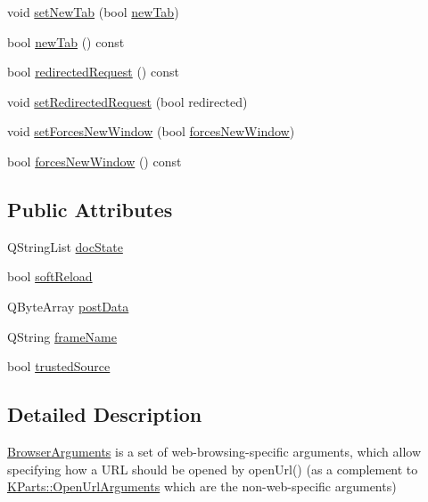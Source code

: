 \begin{DoxyCompactItemize}
\item 
void \hyperlink{structKParts_1_1BrowserArguments_a17bbf30d75c3e5c4d906b91b1c8eed3b}{set\-New\-Tab} (bool \hyperlink{structKParts_1_1BrowserArguments_acdc75a4b3726424aabb4958d58b6e586}{new\-Tab})
\item 
bool \hyperlink{structKParts_1_1BrowserArguments_acdc75a4b3726424aabb4958d58b6e586}{new\-Tab} () const 
\item 
bool \hyperlink{structKParts_1_1BrowserArguments_a3a3c15968b056a76248f483ea613740a}{redirected\-Request} () const 
\item 
void \hyperlink{structKParts_1_1BrowserArguments_a7169bd696dd783e0312f7bf220884e0e}{set\-Redirected\-Request} (bool redirected)
\item 
void \hyperlink{structKParts_1_1BrowserArguments_a0a0f93b431d62e60a9bb411f97be0126}{set\-Forces\-New\-Window} (bool \hyperlink{structKParts_1_1BrowserArguments_add9a79530ee4c265e8e37493d94f1f08}{forces\-New\-Window})
\item 
bool \hyperlink{structKParts_1_1BrowserArguments_add9a79530ee4c265e8e37493d94f1f08}{forces\-New\-Window} () const 
\end{DoxyCompactItemize}
\subsection*{\-Public \-Attributes}
\begin{DoxyCompactItemize}
\item 
\-Q\-String\-List \hyperlink{structKParts_1_1BrowserArguments_a76aed0d1e923b73db918038d23f524ec}{doc\-State}
\item 
bool \hyperlink{structKParts_1_1BrowserArguments_af06b08da058cd6fc19ad42e2904e2594}{soft\-Reload}
\item 
\-Q\-Byte\-Array \hyperlink{structKParts_1_1BrowserArguments_a9c1fb6cb602a10fec4ca05a25f1b9ac6}{post\-Data}
\item 
\-Q\-String \hyperlink{structKParts_1_1BrowserArguments_ad8b767db0ac78790860f4f0cbef64ea2}{frame\-Name}
\item 
bool \hyperlink{structKParts_1_1BrowserArguments_aa9e31eabaee6af2692319d21721fc9cb}{trusted\-Source}
\end{DoxyCompactItemize}


\subsection{\-Detailed \-Description}
\hyperlink{structKParts_1_1BrowserArguments}{\-Browser\-Arguments} is a set of web-\/browsing-\/specific arguments, which allow specifying how a \-U\-R\-L should be opened by open\-Url() (as a complement to \hyperlink{classKParts_1_1OpenUrlArguments}{\-K\-Parts\-::\-Open\-Url\-Arguments} which are the non-\/web-\/specific arguments)

